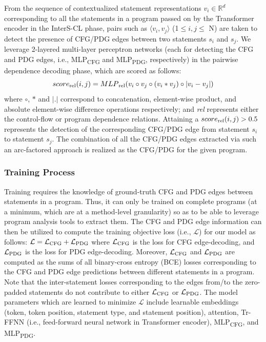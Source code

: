 From the sequence of contextualized statement representations $v_i \in
\mathbb{R}^d$ corresponding to all the statements in a program passed
on by the Transformer encoder in the InterS-CL phase, pairs such
as $\langle v_i, v_j \rangle$ (1$\leq i, j\leq$ N) are taken to detect
the presence of CFG/PDG edges between two statements $s_i$ and
$s_j$. We leverage 2-layered multi-layer perceptron networks (each
for detecting the CFG and PDG edges, i.e., MLP\textsubscript{CFG} and
MLP\textsubscript{PDG}, respectively) in the pairwise dependence
decoding phase, which are scored as follows:
\begin{equation}
\centering
    score\textsubscript{rel}(i, j) = MLP\textsubscript{rel}(v_i \circ v_j \circ (v_i * v_j) \circ |v_i - v_j|)
\end{equation}
where $\circ$, $*$ and $|.|$ correspond to concatenation, element-wise
product, and absolute element-wise difference operations respectively;
and \textit{rel} represents either the control-flow or program
dependence relations. Attaining a $score\textsubscript{rel}(i, j) >
0.5$ represents the detection of the corresponding CFG/PDG edge from
statement $s_i$ to statement $s_j$. The combination of all the CFG/PDG
edges extracted via such an arc-factored approach is realized as the
CFG/PDG for the given program.

\subsubsection{\bf Training Process}

Training \tool requires the knowledge of ground-truth CFG and PDG edges between statements in a program. Thus, it can only be trained on complete programs (at a minimum, which are at a method-level granularity) so as to be able to leverage program analysis tools to extract them. The CFG and PDG edge information can then be utilized to compute the training objective loss (i.e., $\mathcal{L}$) for our model as follows: $\mathcal{L} = \mathcal{L}\textsubscript{CFG} + \mathcal{L}\textsubscript{PDG}$
where $\mathcal{L}\textsubscript{CFG}$ is the loss for CFG edge-decoding, and $\mathcal{L}\textsubscript{PDG}$ is the loss for PDG edge-decoding. Moreover, $\mathcal{L}\textsubscript{CFG}$ and $\mathcal{L}\textsubscript{PDG}$ are computed as the sums of all binary-cross entropy (BCE) losses corresponding to the CFG and PDG edge predictions between different statements in a program. Note that the inter-statement losses corresponding to the edges from/to the zero-padded statements do not contribute to either $\mathcal{L}\textsubscript{CFG}$ or $\mathcal{L}\textsubscript{PDG}$. The model parameters which are learned to minimize $\mathcal{L}$ include learnable embeddings (token, token position, statement type, and statement position), attention, Tr-FFNN (i.e., feed-forward neural network in Transformer encoder), MLP\textsubscript{CFG}, and MLP\textsubscript{PDG}.

